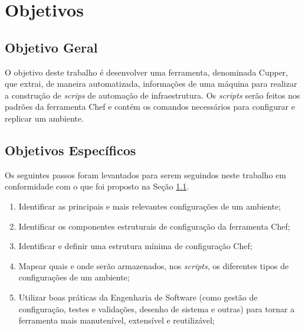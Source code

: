 \section{Objetivos}
\label{sec:obj}

\subsection{Objetivo Geral}
\label{sec:obj-grl}

O objetivo deste trabalho é desenvolver uma ferramenta, denominada Cupper,
que extrai, de maneira automatizada, informações de uma máquina para realizar
a construção de \textit{scrips} de automação de infraestrutura. Os \textit{scripts}
serão feitos nos padrões da ferramenta Chef e contém os comandos
necessários para configurar e replicar um ambiente.

\subsection{Objetivos Específicos}
\label{sec:obj-esp}

Os seguintes passos foram levantados para serem seguindos neste trabalho
em conformidade com o que foi proposto na Seção \ref{sec:obj-grl}.

\begin{enumerate}
  \item Identificar as principais e mais relevantes configurações de um ambiente;
  \item Identificar os componentes estruturais de configuração da ferramenta Chef;
  \item Identificar e definir uma estrutura mínima de configuração Chef;
  \item Mapear quais e onde serão armazenados, nos \textit{scripts}, os
    diferentes tipos de configurações de um ambiente;
  \item Utilizar boas práticas da Engenharia de Software (como gestão de configuração,
    testes e validações, desenho de sistema e outras) para tornar a ferramenta mais
    manutenível, extensível e reutilizável;
\end{enumerate}
